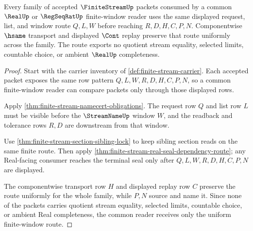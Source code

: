 \begin{theorem}
\label{thm:finite-stream-real-seal-uniform-route}
Every family of accepted $\FiniteStreamUp$ packets consumed by a common $\RealUp$ or $\RegSeqRatUp$ finite-window reader uses the same displayed request, list, and window route $Q,L,W$ before reaching $R,D,H,C,P,N$. Componentwise $\hsame$ transport and displayed $\Cont$ replay preserve that route uniformly across the family. The route exports no quotient stream equality, selected limits, countable choice, or ambient $\RealUp$ completeness.
\end{theorem}
\begin{proof}
Start with the carrier inventory of \autoref{def:finite-stream-carrier}. Each accepted packet exposes the same row pattern $Q,L,W,R,D,H,C,P,N$, so a common finite-window reader can compare packets only through those displayed rows.

Apply \autoref{thm:finite-stream-namecert-obligations}. The request row $Q$ and list row $L$ must be visible before the $\StreamNameUp$ window $W$, and the readback and tolerance rows $R,D$ are downstream from that window.

Use \autoref{thm:finite-stream-section-sibling-lock} to keep sibling section reads on the same finite route. Then apply \autoref{thm:finite-stream-real-seal-dependency-route}; any Real-facing consumer reaches the terminal seal only after $Q,L,W,R,D,H,C,P,N$ are displayed.

The componentwise transport row $H$ and displayed replay row $C$ preserve the route uniformly for the whole family, while $P,N$ source and name it. Since none of the packets carries quotient stream equality, selected limits, countable choice, or ambient Real completeness, the common reader receives only the uniform finite-window route.
\end{proof}
